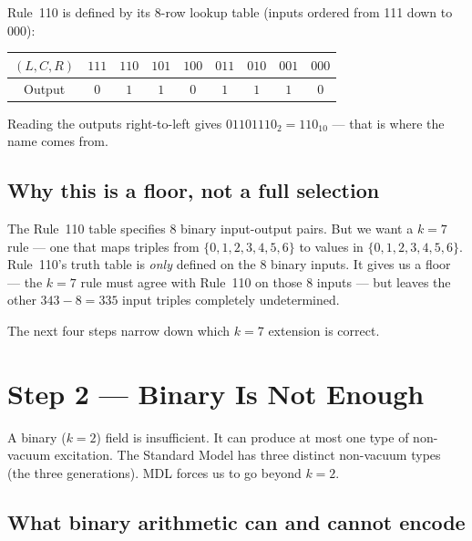 \documentclass[11pt,a4paper]{article}
\theoremstyle{definition}
\begin{document}
Rule~110 is defined by its 8-row lookup table (inputs ordered from 111 down
to 000):

\begin{center}
\begin{tabular}{ccccccccc}
\toprule
$(L,C,R)$ & $111$ & $110$ & $101$ & $100$ & $011$ & $010$ & $001$ & $000$ \\
\midrule
Output & $0$ & $1$ & $1$ & $0$ & $1$ & $1$ & $1$ & $0$ \\
\bottomrule
\end{tabular}
\end{center}

Reading the outputs right-to-left gives $01101110_2 = 110_{10}$ — that is
where the name comes from.

\subsection{Why this is a floor, not a full selection}

The Rule~110 table specifies 8 binary input-output pairs.  But we want a
$k=7$ rule — one that maps triples from $\{0,1,2,3,4,5,6\}$ to values in
$\{0,1,2,3,4,5,6\}$.  Rule~110's truth table is \emph{only} defined on the
8 binary inputs.  It gives us a floor — the $k=7$ rule must agree with
Rule~110 on those 8 inputs — but leaves the other $343 - 8 = 335$ input
triples completely undetermined.

The next four steps narrow down which $k=7$ extension is correct.

\section{Step 2 — Binary Is Not Enough}
\label{sec:step2}

\begin{tcolorbox}[colback=boxorange,colframe=orange!60!black,
  title={Step~2 claim}]
A binary ($k=2$) field is insufficient.  It can produce at most one type of
non-vacuum excitation.  The Standard Model has three distinct non-vacuum
types (the three generations).  MDL forces us to go beyond $k = 2$.
\end{tcolorbox}

\subsection{What binary arithmetic can and cannot encode}
\end{document}
